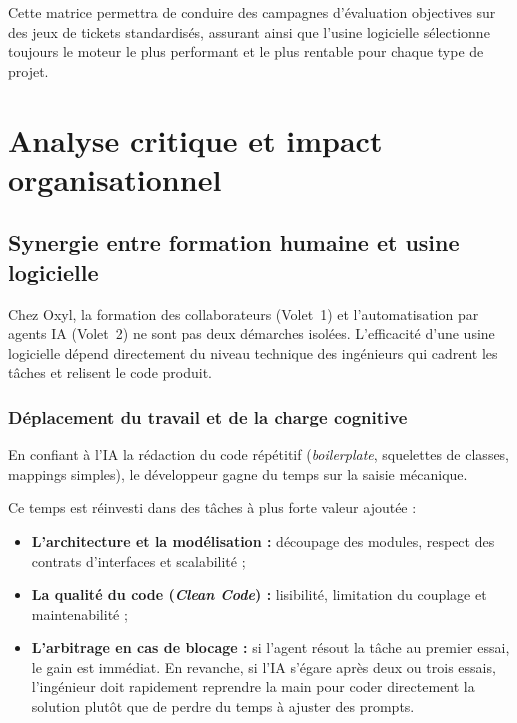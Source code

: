 \documentclass{tnreport}
\begin{document}
Cette matrice permettra de conduire des campagnes d'évaluation objectives sur des jeux de tickets standardisés, assurant ainsi que l'usine logicielle sélectionne toujours le moteur le plus performant et le plus rentable pour chaque type de projet.

\cleardoublepage

\chapter{Analyse critique et impact organisationnel}
\label{chap:analyse_critique}

\section{Synergie entre formation humaine et usine logicielle}
\label{sec:synergie_volets}

Chez Oxyl, la formation des collaborateurs (Volet~1) et l'automatisation par agents IA (Volet~2) ne sont pas deux démarches isolées. L'efficacité d'une usine logicielle dépend directement du niveau technique des ingénieurs qui cadrent les tâches et relisent le code produit.

\subsection{Déplacement du travail et de la charge cognitive}
\label{subsec:boucle_retroaction_cognition}

En confiant à l'IA la rédaction du code répétitif (\textit{boilerplate}, squelettes de classes, mappings simples), le développeur gagne du temps sur la saisie mécanique. 

Ce temps est réinvesti dans des tâches à plus forte valeur ajoutée :
\begin{itemize}
    \item \textbf{L'architecture et la modélisation :} découpage des modules, respect des contrats d'interfaces et scalabilité ;
    \item \textbf{La qualité du code (\textit{Clean Code}) :} lisibilité, limitation du couplage et maintenabilité ;
    \item \textbf{L'arbitrage en cas de blocage :} si l'agent résout la tâche au premier essai, le gain est immédiat. En revanche, si l'IA s'égare après deux ou trois essais, l'ingénieur doit rapidement reprendre la main pour coder directement la solution plutôt que de perdre du temps à ajuster des prompts.
\end{itemize}
\end{document}
